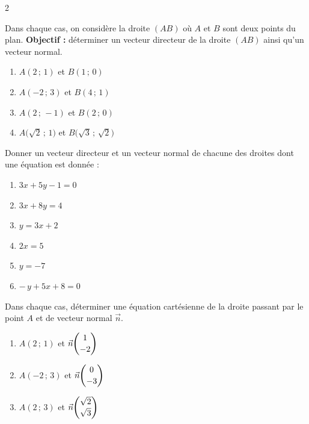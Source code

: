 \documentclass[a4paper,12pt]{article}
\title{
\centering
\tcbset{colframe=BlackSav,colback=GrayBG}
\tcbox[tikznode]{
  Chapitre 8 \\Applications du produit scalaire
}
}
\author{}
\date{}
\begin{document}
\maketitle

\begin{multicols}{2}
\begin{exercice}[title=Exercice 1 $\star$ { [Calculer] }]{}{}
  Dans chaque cas, on considère la droite $(AB)$ où $A$ et $B$ sont deux points du plan.
  \textbf{Objectif :} déterminer un vecteur directeur de la droite $(AB)$ ainsi qu'un vecteur normal.

  \begin{enumerate}
    \item $A(2\,;\,1)$ et $B(1\,;\,0)$
    \item $A(-2\,;\,3)$ et $B(4\,;\,1)$
    \item $A(2\,;\,-1)$ et $B(2\,;\,0)$
    \item $A\bigl(\sqrt{2}\,;\,1\bigr)$ et $B\bigl(\sqrt{3}\,;\,\sqrt{2}\bigr)$
  \end{enumerate}
\end{exercice}

\begin{exercice}[title=Exercice 2 $\star$ { [Calculer] }]{}{}
  Donner un vecteur directeur et un vecteur normal de chacune des droites dont une équation est donnée :
  \begin{enumerate}
    \item $3x + 5y - 1 = 0$
    \item $3x + 8y = 4$
    \item $y = 3x + 2$
    \item $2x = 5$
    \item $y = -7$
    \item $-\,y + 5x + 8 = 0$
  \end{enumerate}
\end{exercice}

\newcolumn

\begin{exercice}[title=Exercice 3 $\star$ { [Calculer] }]{}{}
  Dans chaque cas, déterminer une équation cartésienne de la droite passant par le point $A$ et de vecteur normal $\vec{n}$.
  \begin{enumerate}
    \item $A(2\,;\,1)$ et $\displaystyle \vec{n} \dbinom{1}{-2}$
    \item $A(-2\,;\,3)$ et $\displaystyle \vec{n} \dbinom{0}{-3}$
    \item $A(2\,;\,3)$ et $\displaystyle \vec{n} \dbinom{\sqrt{2}}{\sqrt{3}}$
  \end{enumerate}
\end{exercice}


\end{multicols}
\end{document}
